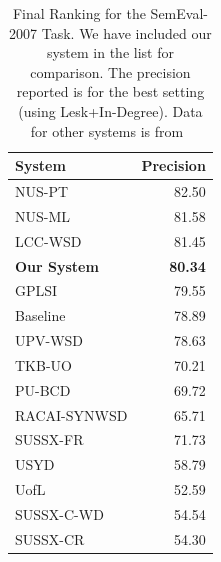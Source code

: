 \documentclass[12pt,letterpaper]{article}
\begin{document}

\begin{table}[H]
\centering
\begin{tabular}{|l|r|}
System & Precision \\
\hline
NUS-PT & 82.50 \\
NUS-ML & 81.58 \\
LCC-WSD & 81.45 \\
\textbf{Our System} & \textbf{80.34}\\
GPLSI & 79.55 \\
Baseline & 78.89 \\
UPV-WSD & 78.63 \\
TKB-UO & 70.21 \\
PU-BCD & 69.72 \\
RACAI-SYNWSD & 65.71 \\
SUSSX-FR & 71.73 \\
USYD & 58.79 \\
UofL & 52.59 \\
SUSSX-C-WD & 54.54 \\
SUSSX-CR & 54.30 \\
\end{tabular}
\caption{Final Ranking for the SemEval-2007 Task. We have included our system in the list for comparison. The precision reported is for the best setting (using Lesk+In-Degree). Data for other systems is from~\cite{navigli2007semeval}}
\label{table:4}
\end{table}

\end{document}
